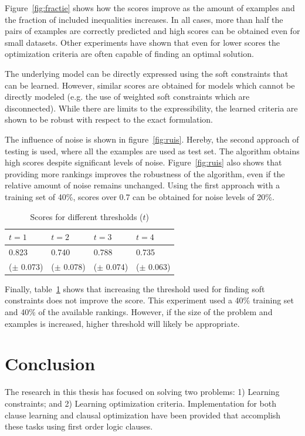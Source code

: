 \documentclass{llncs}
\begin{document}
Figure~\ref{fig:fractie} shows how the scores improve as the amount of examples and the fraction of included inequalities increases.
In all cases, more than half the pairs of examples are correctly predicted and high scores can be obtained even for small datasets.
Other experiments have shown that even for lower scores the optimization criteria are often capable of finding an optimal solution.

The underlying model can be directly expressed using the soft constraints that can be learned.
However, similar scores are obtained for models which cannot be directly modeled (e.g. the use of weighted soft constraints which are disconnected).
While there are limits to the expressibility, the learned criteria are shown to be robust with respect to the exact formulation.

The influence of noise is shown in figure~\ref{fig:ruis}.
Hereby, the second approach of testing is used, where all the examples are used as test set.
The algorithm obtains high scores despite significant levels of noise.
Figure~\ref{fig:ruis} also shows that providing more rankings improves the robustness of the algorithm, even if the relative amount of noise remains unchanged.
Using the first approach with a training set of 40\%, scores over 0.7 can be obtained for noise levels of 20\%.

  \begin{table}
    \caption{Scores for different thresholds ($t$)}
    \begin{tabularx}{\linewidth}{XXXX}
      $t = 1$ & $t = 2$ & $t = 3$ & $t = 4$ \\
      \toprule
     0.823 & 0.740 & 0.788 & 0.735 \\
     ($\pm$ 0.073)&
($\pm$ 0.078)&
($\pm$ 0.074)&
($\pm$ 0.063)
    \end{tabularx}
    \label{tbl:limiet}
  \end{table}

Finally, table~\ref{tbl:limiet} shows that increasing the threshold used for finding soft constraints does not improve the score.
This experiment used a 40\% training set and 40\% of the available rankings.
However, if the size of the problem and examples is increased, higher threshold will likely be appropriate.

\section{Conclusion}
The research in this thesis has focused on solving two problems: 1) Learning constraints; and 2) Learning optimization criteria.
Implementation for both clause learning and clausal optimization have been provided that accomplish these tasks using first order logic clauses.
\end{document}

